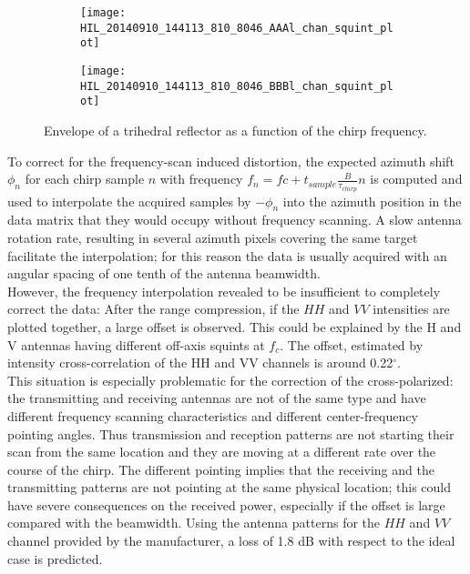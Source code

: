 \begin{figure}[h]
	\begin{subfigure}[b]{\columnwidth}
		\centering
		\texttt{[image: HIL\_20140910\_144113\_810\_8046\_AAAl\_chan\_squint\_plot]}
	\end{subfigure}
	\begin{subfigure}[b]{\columnwidth}
		\centering
		\texttt{[image: HIL\_20140910\_144113\_810\_8046\_BBBl\_chan\_squint\_plot]}
	\end{subfigure}
	\caption{Envelope of a trihedral reflector as a function of the chirp frequency.}
	\label{fig:uncorrected_squint}
\end{figure}
To correct for the frequency-scan induced distortion, the expected azimuth shift $\phi_{n}$ for each chirp sample $n$ with frequency $f_{n} = fc + t_{sample} \frac{B}{\tau_{chirp}}n$ is computed and used to interpolate the acquired samples by $-\phi_{n}$ into the azimuth position in the data matrix that they would occupy without frequency scanning. A slow antenna rotation rate, resulting in several azimuth pixels covering the same target facilitate the interpolation; for this reason the data is usually acquired with an angular spacing of one tenth of the antenna beamwidth.\\ 
However, the frequency interpolation revealed to be insufficient to completely correct the data:
After the range compression, if the $HH$ and $VV$ intensities are plotted together, a large offset is observed. This could be explained by the  H and V antennas having different off-axis squints  at $f_{c}$. The offset, estimated by intensity cross-correlation of the HH and VV channels is  around 0.22$^\circ$.\\
This situation is especially problematic for the correction of the cross-polarized: the transmitting and receiving antennas are not of the same type and have different frequency scanning characteristics and different center-frequency pointing angles. Thus transmission and reception patterns are not starting their scan from the same location and they are moving at a different rate over the course of the chirp. The different pointing implies that the receiving and the transmitting patterns are not pointing at the same physical location; this could have severe consequences on the received power, especially if the offset is large compared with the beamwidth.
Using the antenna patterns for the $HH$ and $VV$ channel provided by the manufacturer, a loss of 1.8 dB with respect to the ideal case is predicted.\\
